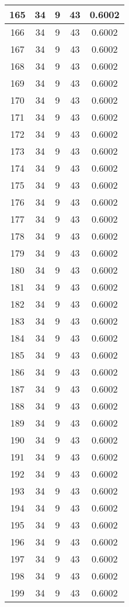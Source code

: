 \documentclass[letterpaper, 12pt]{article}
\begin{document}
\begin{longtable}{|c|c|c|c|c|}
\hline
165 & 34 & 9 & 43 & 0.6002 \\
\hline
166 & 34 & 9 & 43 & 0.6002 \\
\hline
167 & 34 & 9 & 43 & 0.6002 \\
\hline
168 & 34 & 9 & 43 & 0.6002 \\
\hline
169 & 34 & 9 & 43 & 0.6002 \\
\hline
170 & 34 & 9 & 43 & 0.6002 \\
\hline
171 & 34 & 9 & 43 & 0.6002 \\
\hline
172 & 34 & 9 & 43 & 0.6002 \\
\hline
173 & 34 & 9 & 43 & 0.6002 \\
\hline
174 & 34 & 9 & 43 & 0.6002 \\
\hline
175 & 34 & 9 & 43 & 0.6002 \\
\hline
176 & 34 & 9 & 43 & 0.6002 \\
\hline
177 & 34 & 9 & 43 & 0.6002 \\
\hline
178 & 34 & 9 & 43 & 0.6002 \\
\hline
179 & 34 & 9 & 43 & 0.6002 \\
\hline
180 & 34 & 9 & 43 & 0.6002 \\
\hline
181 & 34 & 9 & 43 & 0.6002 \\
\hline
182 & 34 & 9 & 43 & 0.6002 \\
\hline
183 & 34 & 9 & 43 & 0.6002 \\
\hline
184 & 34 & 9 & 43 & 0.6002 \\
\hline
185 & 34 & 9 & 43 & 0.6002 \\
\hline
186 & 34 & 9 & 43 & 0.6002 \\
\hline
187 & 34 & 9 & 43 & 0.6002 \\
\hline
188 & 34 & 9 & 43 & 0.6002 \\
\hline
189 & 34 & 9 & 43 & 0.6002 \\
\hline
190 & 34 & 9 & 43 & 0.6002 \\
\hline
191 & 34 & 9 & 43 & 0.6002 \\
\hline
192 & 34 & 9 & 43 & 0.6002 \\
\hline
193 & 34 & 9 & 43 & 0.6002 \\
\hline
194 & 34 & 9 & 43 & 0.6002 \\
\hline
195 & 34 & 9 & 43 & 0.6002 \\
\hline
196 & 34 & 9 & 43 & 0.6002 \\
\hline
197 & 34 & 9 & 43 & 0.6002 \\
\hline
198 & 34 & 9 & 43 & 0.6002 \\
\hline
199 & 34 & 9 & 43 & 0.6002 \\
\hline
\end{longtable}
\end{document}

